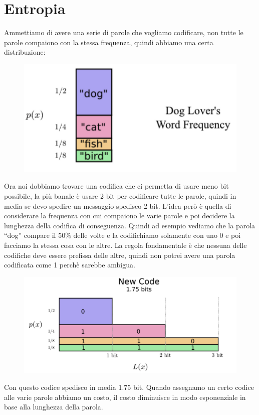 \documentclass[14pt]{extreport}
\begin{document}
\section{Entropia}

Ammettiamo di avere una serie di parole che vogliamo codificare, non tutte le parole compaiono con la stessa frequenza, quindi abbiamo una certa
distribuzione:

\begin{figure}[H]
	\centering
	\includegraphics[width=0.7\linewidth]{596.jpeg}
\end{figure}

Ora noi dobbiamo trovare una codifica che ci permetta di usare meno bit possibile, la più banale è usare 2 bit per codificare tutte le parole, quindi
in media se devo spedire un messaggio spedisco 2 bit. L’idea però è quella di considerare la frequenza con cui compaiono le varie parole e poi
decidere la lunghezza della codifica di conseguenza. Quindi ad esempio vediamo che la parola “dog” compare il $50\%$ delle volte e la codifichiamo
solamente con uno 0 e poi facciamo la stessa cosa con le altre. La regola fondamentale è che nessuna delle codifiche deve essere prefissa delle altre,
quindi non potrei avere una parola codificata come 1 perchè sarebbe ambigua.


\begin{figure}[H]
	\centering
	\includegraphics[width=0.7\linewidth]{597.jpeg}
\end{figure}

Con questo codice spedisco in media 1.75 bit. Quando assegnamo un certo codice alle varie parole abbiamo un costo, il costo diminuisce in modo
esponenziale in base alla lunghezza della parola.
\end{document}
